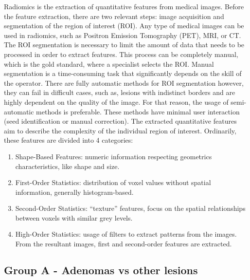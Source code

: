 \documentclass{article}
\begin{document}
Radiomics is the extraction of quantitative features from medical images. Before the feature extraction, there are two relevant
steps: image acquisition and segmentation of the region of interest (ROI). Any type of medical images can be used in radiomics,
such as Positron Emission Tomography (PET), MRI, or CT. The ROI segmentation is necessary to limit the amount of data that needs
to be processed in order to extract features. This process can be completely manual, which is the gold standard, where a specialist
selects the ROI. Manual segmentation is a time-consuming task that significantly depends on the skill of the operator. There are
fully automatic methods for ROI segmentation however, they can fail in difficult cases, such as, lesions with indistinct borders
and are highly dependent on the quality of the image. For that reason, the usage of semi-automatic methods is preferable.
These methods have minimal user interaction (seed identification or manual correction). The extracted quantitative features aim
to describe the complexity of the individual region of interest. Ordinarily, these features are divided into 4 categories:
\begin{enumerate}
    \item Shape-Based Features: numeric information respecting geometrics characteristics, like shape and size.
    \item First-Order Statistics: distribution of voxel values without spatial information, generally histogram-based.
    \item Second-Order Statistics: “texture” features, focus on the spatial relationships between voxels with similar grey levels.
    \item High-Order Statistics: usage of filters to extract patterns from the images. From the resultant images, first and second-order features are extracted.
\end{enumerate}



\subsection{Group A - Adenomas vs other lesions}
\end{document}
